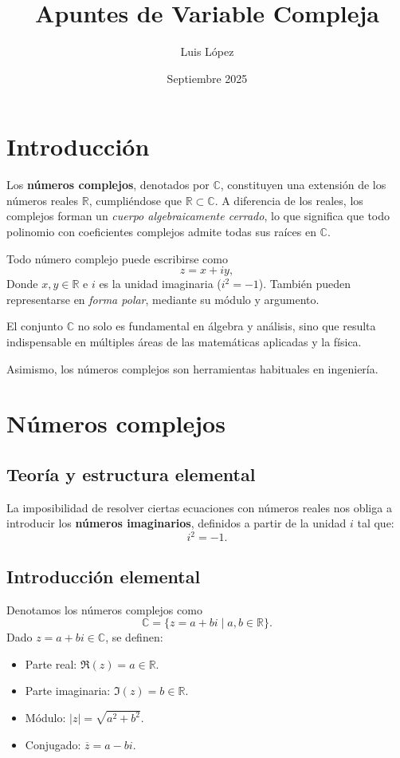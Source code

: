 \documentclass[a4paper,12pt]{article}
\title{Apuntes de Variable Compleja}
\author{Luis López}
\date{Septiembre 2025}
\begin{document}
\maketitle
\clearpage

\tableofcontents
\clearpage

\section*{Introducción}
\noindent
Los \textbf{números complejos}, denotados por $\mathbb{C}$, constituyen una extensión de los números reales $\mathbb{R}$, cumpliéndose que $\mathbb{R} \subset \mathbb{C}$.
A diferencia de los reales, los complejos forman un \textit{cuerpo algebraicamente cerrado}, lo que significa que todo polinomio con coeficientes complejos admite todas sus raíces en $\mathbb{C}$.

\medskip
\noindent
Todo número complejo puede escribirse como
\[
z = x + iy,
\]
Donde $x, y \in \mathbb{R}$ e $i$ es la unidad imaginaria ($i^2=-1$).
También pueden representarse en \textit{forma polar}, mediante su módulo y argumento.

\medskip
\noindent
El conjunto $\mathbb{C}$ no solo es fundamental en álgebra y análisis, sino que resulta indispensable en múltiples áreas de las matemáticas aplicadas y la física.

\medskip
\noindent
Asimismo, los números complejos son herramientas habituales en ingeniería.

\clearpage

\section{Números complejos}

\subsection{Teoría y estructura elemental}
\noindent
La imposibilidad de resolver ciertas ecuaciones con números reales nos obliga a introducir los
\textbf{números imaginarios}, definidos a partir de la unidad $i$ tal que:
\[
    i^2 = -1.
\]

\subsection{Introducción elemental}
\noindent
Denotamos los números complejos como
\[
    \mathbb{C} = \{ z = a + bi \;|\; a,b \in \mathbb{R} \}.
\]
Dado $z = a+bi \in \mathbb{C}$, se definen:
\begin{itemize}
    \item Parte real: $\Re(z) = a \in \mathbb{R}$.
    \item Parte imaginaria: $\Im(z) = b \in \mathbb{R}$.
    \item Módulo: $|z| = \sqrt{a^2+b^2}$.
    \item Conjugado: $\overline{z} = a - bi$.
\end{itemize}
\end{document}
